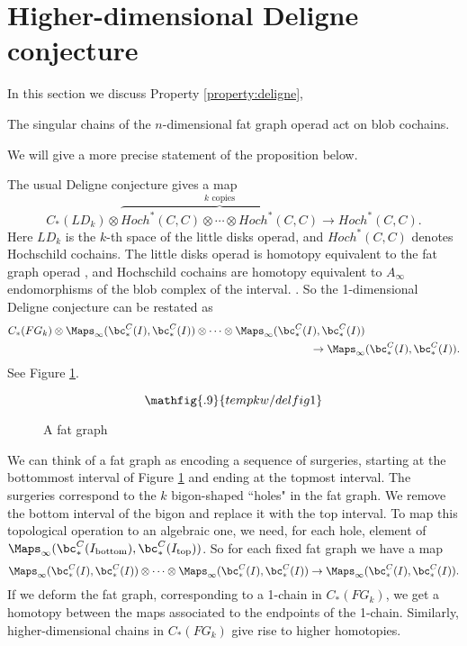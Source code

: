 
\section{Higher-dimensional Deligne conjecture}
\label{sec:deligne}
In this section we discuss Property \ref{property:deligne},
\begin{prop}
The singular chains of the $n$-dimensional fat graph operad act on blob cochains.
\end{prop}

We will give a more precise statement of the proposition below.


\def\mapinf{\Maps_\infty}

The usual Deligne conjecture  gives a map
\[
	C_*(LD_k)\otimes \overbrace{Hoch^*(C, C)\otimes\cdots\otimes Hoch^*(C, C)}^{\text{$k$ copies}}
			\to  Hoch^*(C, C) .
\]
Here $LD_k$ is the $k$-th space of the little disks operad, and $Hoch^*(C, C)$ denotes Hochschild
cochains.
The little disks operad is homotopy equivalent to the fat graph operad
, and Hochschild cochains are homotopy equivalent to $A_\infty$ endomorphisms
of the blob complex of the interval.
.
So the 1-dimensional Deligne conjecture can be restated as
\begin{eqnarray*}
	C_*(FG_k)\otimes \mapinf(\bc^C_*(I), \bc^C_*(I))\otimes\cdots
	\otimes \mapinf(\bc^C_*(I), \bc^C_*(I)) & \\
	  & \hspace{-5em} \to  \mapinf(\bc^C_*(I), \bc^C_*(I)) .
\end{eqnarray*}
See Figure \ref{delfig1}.
\begin{figure}[!ht]
$$\mathfig{.9}{tempkw/delfig1}$$
\caption{A fat graph}\label{delfig1}\end{figure}

We can think of a fat graph as encoding a sequence of surgeries, starting at the bottommost interval
of Figure \ref{delfig1} and ending at the topmost interval.
The surgeries correspond to the $k$ bigon-shaped ``holes" in the fat graph.
We remove the bottom interval of the bigon and replace it with the top interval.
To map this topological operation to an algebraic one, we need, for each hole, element of
$\mapinf(\bc^C_*(I_{\text{bottom}}), \bc^C_*(I_{\text{top}}))$.
So for each fixed fat graph we have a map
\[
	 \mapinf(\bc^C_*(I), \bc^C_*(I))\otimes\cdots
	\otimes \mapinf(\bc^C_*(I), \bc^C_*(I))  \to  \mapinf(\bc^C_*(I), \bc^C_*(I)) .
\]
If we deform the fat graph, corresponding to a 1-chain in $C_*(FG_k)$, we get a homotopy
between the maps associated to the endpoints of the 1-chain.
Similarly, higher-dimensional chains in $C_*(FG_k)$ give rise to higher homotopies.

